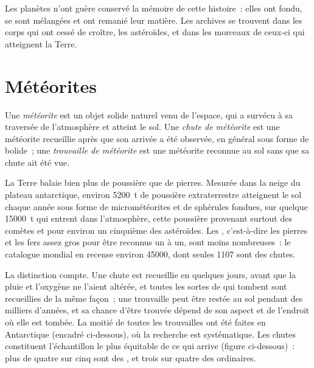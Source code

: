 Les planètes n'ont guère conservé la mémoire de cette histoire~: elles ont fondu, se sont mélangées et ont
remanié leur matière. Les archives se trouvent dans les corps qui ont cessé de croître, les astéroïdes, et dans
les morceaux de ceux-ci qui atteignent la Terre.

\section{Météorites}

\begin{definition}
\label{def:b2:planet-formation-meteorites:fall-find}
Une \emph{météorite} est un objet solide naturel venu de l'espace, qui
a survécu à sa traversée de l'atmosphère et atteint le sol. Une \emph{chute de
météorite} est une météorite recueillie après que son arrivée
a été observée, en général sous forme de bolide~; une \emph{trouvaille de
météorite} est une météorite reconnue au sol sans que sa
chute ait été vue.
\end{definition}

La Terre balaie bien plus de poussière que de pierres. Mesurée dans la neige du plateau
antarctique, environ \qty{5200}{t} de poussière extraterrestre atteignent le sol chaque année
sous forme de micrométéorites et de sphérules fondues, sur quelque \qty{15000}{t} qui entrent
dans l'atmosphère, cette poussière provenant surtout des comètes et pour environ un cinquième
des astéroïdes. Les , c'est-à-dire les pierres et les fers assez gros pour être
reconnus un à un, sont moins nombreuses~: le catalogue mondial en recense environ \num{45000},
dont seules \num{1107} sont des chutes.

La distinction compte. Une chute est recueillie en quelques jours, avant que la pluie et l'oxygène ne
l'aient altérée, et toutes les sortes de  qui tombent sont recueillies de la même façon~; une
trouvaille peut être restée au sol pendant des milliers d'années, et sa chance d'être trouvée dépend de
son aspect et de l'endroit où elle est tombée. La moitié de toutes les trouvailles ont été faites en
Antarctique (encadré ci-dessous), où la recherche est systématique. Les chutes constituent l'échantillon
le plus équitable de ce qui arrive (figure ci-dessous)~: plus de quatre sur cinq sont des , et
trois sur quatre des  ordinaires.

